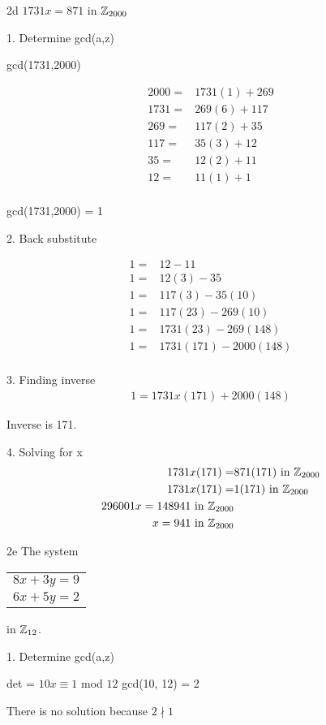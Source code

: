 \begin{question}{2d}
$1731x = 871$ in $\mathbb{Z}_{2000}$

1. Determine gcd(a,z)

gcd(1731,2000)

\begin{align*}
2000 =& 1731(1) + 269 \\
1731 =& 269(6) + 117 \\
269 =& 117(2) + 35 \\
117 =& 35(3) + 12 \\
35 =& 12(2) + 11 \\
12 =& 11(1) + 1 \\
\end{align*}

gcd(1731,2000) = 1

2. Back substitute

\begin{align*}
1 =& 12 - 11\\
1 =& 12(3) - 35\\
1 =& 117(3) - 35(10)\\
1 =& 117(23) - 269(10)\\
1 =& 1731(23) - 269(148)\\
1 =& 1731(171) - 2000(148)\\
\end{align*}

3. Finding inverse
\begin{align*}
1 = 1731x(171) + 2000(148)
\end{align*}

Inverse is 171. 

4. Solving for x
\begin{align*}
1731x(171) =& 871(171) \textrm{ in } \mathbb{Z}_{2000}\\
1731x(171) =& 1(171) \textrm{ in } \mathbb{Z}_{2000}\\
296001x = 148941 \textrm{ in } \mathbb{Z}_{2000}\\
x = 941 \textrm{ in } \mathbb{Z}_{2000}\\
\end{align*}
\end{question}

\begin{question}{2e}
The system 
\begin{tabular}{l}
$8x + 3y=9$\\
$6x + 5y=2$
\end{tabular}
in $\mathbb{Z}_{12}$.

1. Determine gcd(a,z)

det = $10x \equiv 1$ mod $12$
gcd(10, 12) = 2

There is no solution because $2\nmid 1$

\end{question}

